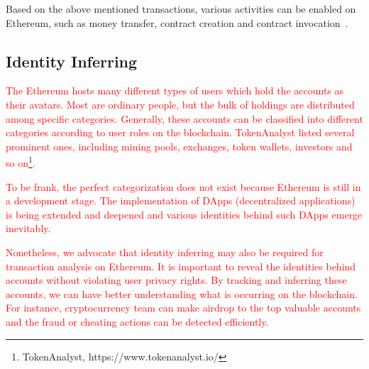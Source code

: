  

Based on the above mentioned transactions, various activities can be enabled on Ethereum, such as money transfer, contract creation and contract invocation~\cite{chen2018infocom}. 



\subsection{Identity Inferring}
\textcolor{red}{The Ethereum hosts many different types of users which hold the accounts as their avatars. Most are ordinary people, but the bulk of holdings are distributed among specific categories. Generally, these accounts can be classified into different categories according to user roles on the blockchain. TokenAnalyst listed several prominent ones, including  mining pools, exchanges, token wallets, investors and so on\footnote{TokenAnalyst, https://www.tokenanalyst.io/}.}

\textcolor{red}{To be frank, the perfect categorization does not exist because Ethereum is still in a development stage. The implementation of DApps (decentralized applications) is being extended and deepened and various identities behind such DApps emerge inevitably.}

\textcolor{red}{Nonetheless, we advocate that identity inferring may also be required for transaction analysis on Ethereum. It is important to reveal the identities behind accounts without violating user privacy rights. By tracking and inferring these accounts, we can have better understanding what is occurring on the blockchain. For instance, cryptocurrency team can make airdrop to the top valuable accounts and the fraud or cheating actions can be detected efficiently.}

